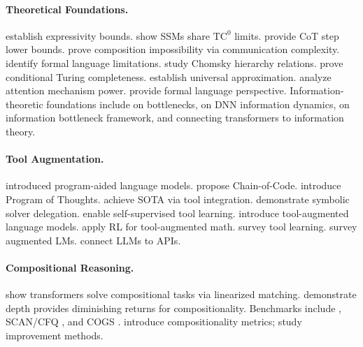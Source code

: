 \documentclass{article}
\theoremstyle{plain}
\theoremstyle{definition}
\theoremstyle{remark}
\begin{document}
\paragraph{Theoretical Foundations.} \citet{merrill2024expressive} establish expressivity bounds. \citet{merrill2024illusion} show SSMs share $\text{TC}^0$ limits. \citet{bavandpour2025lower} provide CoT step lower bounds. \citet{peng2024limitations} prove composition impossibility via communication complexity. \citet{hahn2020theoretical} identify formal language limitations. \citet{deletang2023chomsky} study Chomsky hierarchy relations. \citet{perez2021turing} prove conditional Turing completeness. \citet{yun2020universal} establish universal approximation. \citet{bhattamishra2020computational} analyze attention mechanism power. \citet{strobl2024formal} provide formal language perspective. Information-theoretic foundations include \citet{tishby2015information} on bottlenecks, \citet{shwartzziv2017opening} on DNN information dynamics, \citet{goldfeld2020information} on information bottleneck framework, and \citet{kirsch2024general} connecting transformers to information theory.

\paragraph{Tool Augmentation.} \citet{gao2023pal} introduced program-aided language models. \citet{li2023chaincode} propose Chain-of-Code. \citet{chen2023program} introduce Program of Thoughts. \citet{gou2024tora} achieve SOTA via tool integration. \citet{pan2024logiclm} demonstrate symbolic solver delegation. \citet{schick2023toolformer} enable self-supervised tool learning. \citet{parisi2022talm} introduce tool-augmented language models. \citet{yang2024agentmath} apply RL for tool-augmented math. \citet{qin2024tool} survey tool learning. \citet{mialon2023augmented} survey augmented LMs. \citet{patil2023gorilla} connect LLMs to APIs.

\paragraph{Compositional Reasoning.} \citet{dziri2024faith} show transformers solve compositional tasks via linearized matching. \citet{petty2024depth} demonstrate depth provides diminishing returns for compositionality. Benchmarks include \citet{lake2018generalization}, SCAN/CFQ \citep{keysers2020measuring}, and COGS \citep{kim2020cogs}. \citet{press2023measuring} introduce compositionality metrics; \citet{ontanon2022making} study improvement methods.
\end{document}
